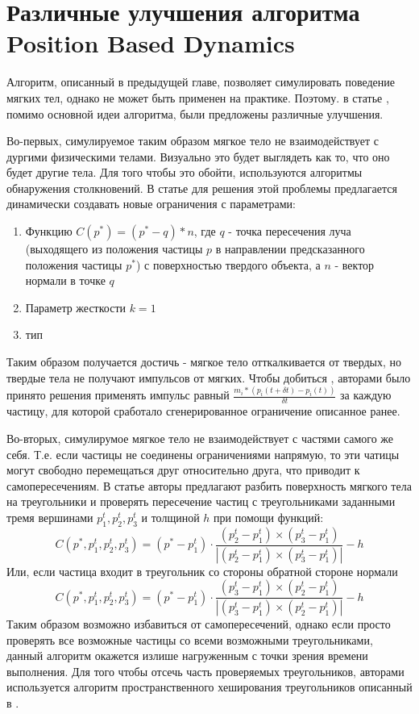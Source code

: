 \section{Различные улучшения алгоритма Position Based Dynamics} \label{ch2:pbr-improvments} %
	Алгоритм, описанный в предыдущей главе, позволяет симулировать поведение мягких тел, однако не может быть применен на практике. Поэтому. в статье \cite{pbd}, помимо основной идеи алгоритма, были предложены различные улучшения.
	
	Во-первых, симулируемое таким образом мягкое тело не взаимодействует с дургими физическими телами. Визуально это будет выглядеть как то, что оно будет  другие тела. Для того чтобы это обойти, используются алгоритмы обнаружения столкновений. В статье \cite{pbd} для решения этой проблемы предлагается динамически создавать новые ограничения с параметрами:
	\begin{enumerate}[1.]
		\item Функцию $C(p^*) = (p^* - q) * n$, где $q$ - точка пересечения луча (выходящего из положения частицы $p$ в направлении предсказанного положения частицы $p^*$) с поверхностью твердого объекта, а $n$ - вектор нормали в точке $q$
		\item Параметр жесткости $k = 1$
		\item тип 
	\end{enumerate}
	Таким образом получается достичь  - мягкое тело отткалкивается от твердых, но твердые тела не получают импульсов от мягких. Чтобы добиться , авторами было принято решения применять импульс равный $\frac{m_i*(p_i(t + \delta t) - p_i(t))}{\delta t}$ за каждую частицу, для которой сработало сгенерированное ограничение описанное ранее.
		
	Во-вторых, симулирумое мягкое тело не взаимодействует с частями самого же себя. Т.е. если частицы не соединены ограничениями напрямую, то эти чатицы могут свободно перемещаться друг относительно друга, что приводит к самопересечениям. В статье \cite{pbd} авторы предлагают разбить поверхность мягкого тела на треугольники и проверять пересечение частиц с треугольниками заданными тремя вершинами $p_1^t, p_2^t, p_3^t$ и толщиной $h$ при помощи функций:
	\begin{equation}
		C(p^*, p_1^t, p_2^t, p_3^t) = (p^* - p_1^t) \cdot \frac{(p_2^t - p_1^t) \times (p_3^t - p_1^t)}{|(p_2^t - p_1^t) \times (p_3^t - p_1^t)|} - h
	\end{equation}
	Или, если частица входит в треугольник со стороны обратной стороне нормали
	\begin{equation}
		C(p^*, p_1^t, p_2^t, p_3^t) = (p^* - p_1^t) \cdot \frac{(p_3^t - p_1^t) \times (p_2^t - p_1^t)}{|(p_3^t - p_1^t) \times (p_2^t - p_1^t)|} - h
	\end{equation}	
	Таким образом возможно избавиться от самопересечений, однако если просто проверять все возможные частицы со всеми возможными треугольниками, данный алгоритм окажется излише нагруженным с точки зрения времени выполнения. Для того чтобы отсечь часть проверяемых треугольников, авторами используется алгоритм пространственного хеширования треугольников описанный в \cite{teschner2003optimized}.
	
